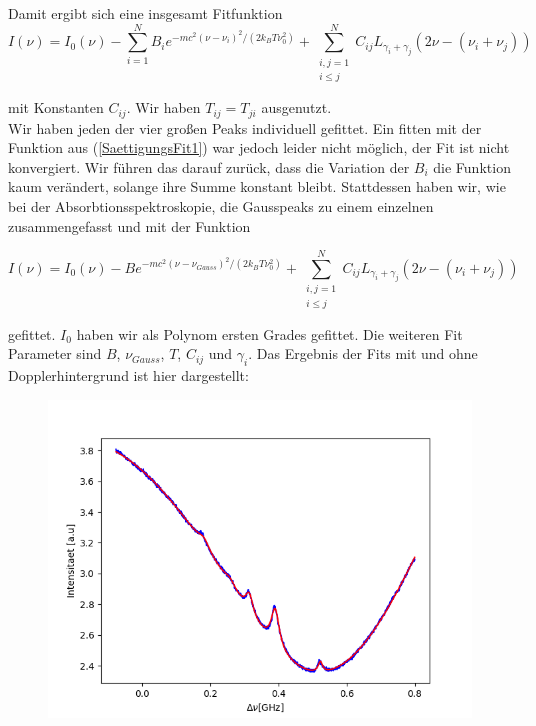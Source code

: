 \documentclass[a4paper,parskip]{scrartcl}
\begin{document}
Damit ergibt sich eine insgesamt Fitfunktion
\begin{equation}
I(\nu) = I_0(\nu)-\sum_{i=1}^N B_i e^{-mc^2(\nu-\nu_i)^2/(2k_BT\nu_0^2)} +\sum_{\substack{i,j=1\\i\leq j}}^N C_{ij} L_{\gamma_i+\gamma_j}(2\nu-(\nu_i+\nu_j))
\label{SaettigungsFit1}
\end{equation}


mit Konstanten $C_{ij}$. Wir haben $T_{ij}=T_{ji}$ ausgenutzt.\\

Wir haben jeden der vier großen Peaks individuell gefittet. Ein fitten mit der Funktion aus (\ref{SaettigungsFit1}) war jedoch leider nicht möglich, der Fit ist nicht konvergiert. Wir führen das darauf zurück, dass die Variation der $B_i$ die Funktion kaum verändert, solange ihre Summe konstant bleibt. Stattdessen haben wir, wie bei der Absorbtionsspektroskopie, die Gausspeaks zu einem einzelnen zusammengefasst und mit der Funktion

 \begin{equation}
I(\nu) = I_0(\nu)-B e^{-mc^2(\nu-\nu_{Gauss})^2/(2k_BT\nu_0^2)} +\sum_{\substack{i,j=1\\i\leq j}}^N C_{ij} L_{\gamma_i+\gamma_j}(2\nu-(\nu_i+\nu_j))
\label{SaettigungsFit2}
\end{equation}

gefittet. $I_0$ haben wir als Polynom ersten Grades gefittet. Die weiteren Fit Parameter sind $B$, $\nu_{Gauss}$, $T$, $C_{ij}$ und $\gamma_i$. Das Ergebnis der Fits mit und ohne Dopplerhintergrund ist hier dargestellt:

\begin{figure}[h]
\includegraphics[scale = 0.5]{./saturation/peak1/fit.png}
\end{figure}
\end{document}
